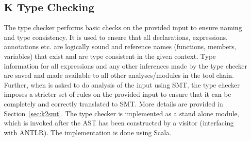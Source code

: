 \subsection{K Type Checking}

The \Klang{} type checker performs basic checks on the provided input
to ensure naming and type consistency. It is used to ensure that all
declarations, expressions, annotations etc. are logically sound and
reference names (functions, members, variables) that exist and are
type consistent in the given context. Type information for all
expressions and any other inferences made by the type checker are
saved and made available to all other analyses/modules in the \Klang{}
tool chain. Further, when \Klang{} is asked to do analysis of the
input using SMT, the type checker imposes a stricter set of rules on
the provided input to ensure that it can be completely and correctly
translated to SMT. More details are provided in
Section~\ref{sec:k2smt}. The type checker is implemented as a stand
alone module, which is invoked after the AST has been constructed by a
visitor (interfacing with ANTLR). The implementation is done using
Scala.

